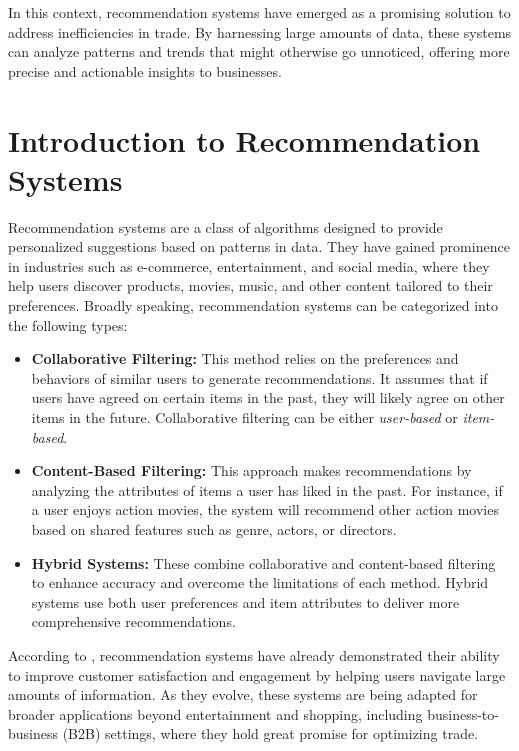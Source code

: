 \documentclass[10pt,twocolumn,twoside,slovak,a4paper]{article}
\begin{document}
In this context, recommendation systems have emerged as a promising solution to address inefficiencies in trade. By harnessing large amounts of data, these systems can analyze patterns and trends that might otherwise go unnoticed, offering more precise and actionable insights to businesses.



\section{Introduction to Recommendation Systems}

Recommendation systems are a class of algorithms designed to provide personalized suggestions based on patterns in data. They have gained prominence in industries such as e-commerce, entertainment, and social media, where they help users discover products, movies, music, and other content tailored to their preferences. Broadly speaking, recommendation systems can be categorized into the following types:

\begin{itemize}
    \item \textbf{Collaborative Filtering:} This method relies on the preferences and behaviors of similar users to generate recommendations. It assumes that if users have agreed on certain items in the past, they will likely agree on other items in the future. Collaborative filtering can be either \textit{user-based} or \textit{item-based}.
    
    \item \textbf{Content-Based Filtering:} This approach makes recommendations by analyzing the attributes of items a user has liked in the past. For instance, if a user enjoys action movies, the system will recommend other action movies based on shared features such as genre, actors, or directors.
    
    \item \textbf{Hybrid Systems:} These combine collaborative and content-based filtering to enhance accuracy and overcome the limitations of each method. Hybrid systems use both user preferences and item attributes to deliver more comprehensive recommendations.
\end{itemize}

\noindent According to \cite{author2023}, recommendation systems have already demonstrated their ability to improve customer satisfaction and engagement by helping users navigate large amounts of information. As they evolve, these systems are being adapted for broader applications beyond entertainment and shopping, including business-to-business (B2B) settings, where they hold great promise for optimizing trade.
\end{document}
